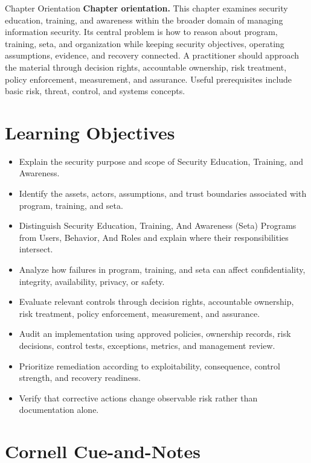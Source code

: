\documentclass[11pt,letterpaper]{article}
\title{\CornellDocumentTitle}
\author{}
\date{}
\begin{document}
\maketitle
\begin{CornellOverviewBox}{Chapter Orientation}
\textbf{Chapter orientation.} This chapter examines security education, training, and awareness within the broader domain of managing information security. Its central problem is how to reason about program, training, seta, and organization while keeping security objectives, operating assumptions, evidence, and recovery connected. A practitioner should approach the material through decision rights, accountable ownership, risk treatment, policy enforcement, measurement, and assurance. Useful prerequisites include basic risk, threat, control, and systems concepts.
\end{CornellOverviewBox}
\section*{Learning Objectives}
\begin{itemize}
\item Explain the security purpose and scope of Security Education, Training, and Awareness.
\item Identify the assets, actors, assumptions, and trust boundaries associated with program, training, and seta.
\item Distinguish Security Education, Training, And Awareness (Seta) Programs from Users, Behavior, And Roles and explain where their responsibilities intersect.
\item Analyze how failures in program, training, and seta can affect confidentiality, integrity, availability, privacy, or safety.
\item Evaluate relevant controls through decision rights, accountable ownership, risk treatment, policy enforcement, measurement, and assurance.
\item Audit an implementation using approved policies, ownership records, risk decisions, control tests, exceptions, metrics, and management review.
\item Prioritize remediation according to exploitability, consequence, control strength, and recovery readiness.
\item Verify that corrective actions change observable risk rather than documentation alone.
\end{itemize}
\section*{Cornell Cue-and-Notes}
\end{document}
